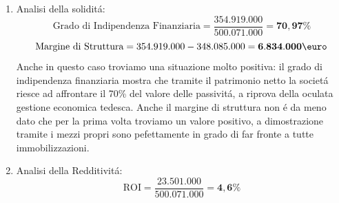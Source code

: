 \documentclass[
    corpo=12pt,
    oneside,
    evenboxes,
    tipotesi=triennale,
    stile=classica,
    oldstyle,
    autoretitolo,
    greek,
]{toptesi}
\begin{document}
\begin{interlinea}{1.5}
\begin{enumerate}
\begin{figure}
            \caption{Stato Patrimoniale Borussia Dortmund al 30 Giungno 2019}
            \label{sp_dor}  
        \end{figure}
        \begin{equation}
                \text{Margine di Tesoreria} = 123.787.000-128.067.000 = \mathbf{-4.280.000\mbox{\euro}}
            \label{eqn: marg_teso_dor}
        \end{equation}
        \begin{equation}
                \text{Indice di liquidit\'a primaria} = \frac{123.787.000}{128.067.000} = \mathbf{96,65\%}
            \label{eqn: ind_liq_dor}
        \end{equation}
       Per la prima volta troviamo una situazione positiva per la posizione di liquidit\'a: il margine di tesoreria \'e si negativo, ma di solo
       4mln€ e l'indice di liquidit\'a spiega come le passivit\'a a breve siano coperte per il 96\% da mezzi liquidi e quindi subito disponbili,
       rendendo il Borussia una societ\'a che nel complesso puo\'o far fronte completamente ai debiti nel breve termine.
    \item Analisi della solidit\'a:\newline
        \begin{equation}
            \text{Grado di Indipendenza Finanziaria} = \frac{354.919.000}{500.071.000} = \mathbf{70,97\%}
        \label{eqn: indeb_dor}
        \end{equation}
        \begin{equation}
            \text{Margine di Struttura} = 354.919.000-348.085.000 = \mathbf{6.834.000\mbox{\euro}}
            \label{eqn: marg_strutt_dor}
        \end{equation}
        Anche in questo caso troviamo una situazione molto positiva: il grado di indipendenza finanziaria mostra che tramite il patrimonio
        netto la societ\'a riesce ad affrontare il 70\% del valore delle passivit\'a, a riprova della oculata gestione economica tedesca.
        Anche il margine di struttura non \'e da meno dato che per la prima volta troviamo un valore positivo, a dimostrazione tramite i mezzi
        propri sono pefettamente in grado di far fronte a tutte immobilizzazioni.  \newline
    \item Analisi della Redditivit\'a:\newline
        \begin{equation}
            \text{ROI} = \frac{23.501.000}{500.071.000} = \mathbf{4,6\%}
        \label{eqn: roi_dor}

\end{equation}
\end{enumerate}
\end{interlinea}
\end{document}
